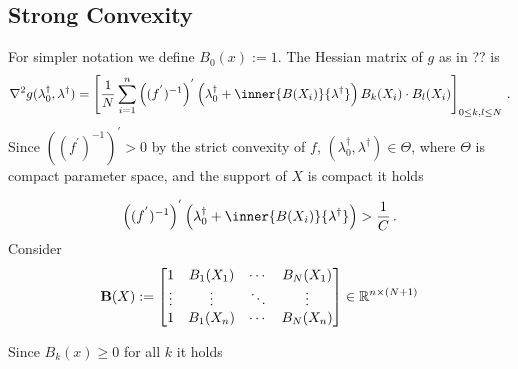 \subsection*{Strong Convexity}
For simpler notation we define $B_0(x):=1$.
The Hessian matrix of $g$ as in ??
is
\begin{gather}
  \nabla^2 
  g(\lambda_0^\dagger,\lambda^\dagger)
  =
  \left[ 
    \frac{1}{N}
    \sum_{i=1}^{n} 
    \left( 
    (
    f^{'}
    )
    ^{-1}
    \right)
    ^{'}
    \left( 
      \lambda_0^\dagger
      +
      \inner{B(X_i)}
      {\lambda^\dagger}
    \right)
    B_k(X_i)
    \cdot
    B_l(X_i)
  \right]
  _{0\le k,l\le N}
  \,.
\end{gather}
Since
$
    \left( 
    (
    f^{'}
    )
    ^{-1}
    \right)
    ^{'}
    >0
$
by the strict convexity of $f$, 
$(\lambda_0^\dagger,\lambda^\dagger)\in \Theta$,
where $\Theta$ is compact parameter space,
and the support of $X$ is compact it holds

\begin{gather}
     \left( 
    (
    f^{'}
    )
    ^{-1}
    \right)
    ^{'}
    \left( 
      \lambda_0^\dagger
      +
      \inner{B(X_i)}
      {\lambda^\dagger}
    \right)
    >
    \frac{1}{C}
    \,.
\end{gather}
Consider
\begin{gather}
  \mathbf{B}(X):=
  \begin{bmatrix}
    1 & B_1(X_1) & \cdots & B_N(X_1)\\
    \vdots & \vdots & \ddots & \vdots \\
    1 & B_1(X_n) & \cdots & B_N(X_n)
  \end{bmatrix}
  \in \mathbb{R}^{n\times (N+1)}
\end{gather}

Since $B_k(x)\ge 0$ for all $k$ it holds


